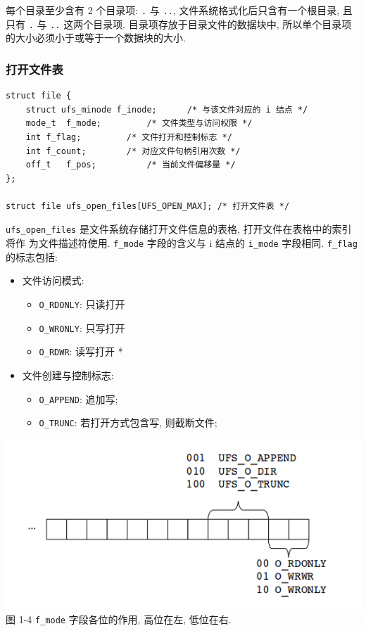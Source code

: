 \documentclass[nofonts]{ctexart}
\begin{document}
每个目录至少含有 2 个目录项: \texttt{.} 与 \texttt{..},
文件系统格式化后只含有一个根目录, 且只有 \texttt{.} 与 \texttt{..}
这两个目录项. 目录项存放于目录文件的数据块中,
所以单个目录项的大小必须小于或等于一个数据块的大小.

\subsubsection{打开文件表}\label{ux6253ux5f00ux6587ux4ef6ux8868}

\begin{verbatim}
struct file {
    struct ufs_minode f_inode;      /* 与该文件对应的 i 结点 */
    mode_t  f_mode;         /* 文件类型与访问权限 */
    int f_flag;         /* 文件打开和控制标志 */
    int f_count;        /* 对应文件句柄引用次数 */
    off_t   f_pos;          /* 当前文件偏移量 */
};

struct file ufs_open_files[UFS_OPEN_MAX]; /* 打开文件表 */
\end{verbatim}

\texttt{ufs\_open\_files} 是文件系统存储打开文件信息的表格,
打开文件在表格中的索引将作 为文件描述符使用. \texttt{f\_mode}
字段的含义与 i 结点的 \texttt{i\_mode} 字段相同. \texttt{f\_flag}
的标志包括:
\begin{itemize}
    \item
        文件访问模式: 
        \begin{itemize}
            \item
                \texttt{O\_RDONLY}: 只读打开
            \item
                \texttt{O\_WRONLY}: 只写打开
            \item
                \texttt{O\_RDWR}: 读写打开 *
        \end{itemize}
    \item
        文件创建与控制标志: 
        \begin{itemize}
            \item
                \texttt{O\_APPEND}: 追加写; 
            \item
                \texttt{O\_TRUNC}:
                若打开方式包含写, 则截断文件;
        \end{itemize}
\end{itemize}

\includegraphics[width=15cm]{./images/./file_mode.png}\\图 1-4 \texttt{f\_mode}
字段各位的作用, 高位在左, 低位在右.
\end{document}
